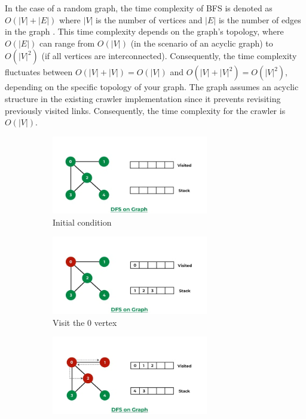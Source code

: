 In the case of a random graph, the time complexity of BFS is denoted as $O(|V|+|E|)$ where $|V|$ is the number of vertices and $|E|$ is the number of edges in the graph \cite{introduction-to-algorithms}. This time complexity depends on the graph's topology, where $O(|E|)$ can range from $O(|V|)$ (in the scenario of an acyclic graph) to $O(|V|^2)$ (if all vertices are interconnected). Consequently, the time complexity fluctuates between $O(|V| + |V|) = O(|V|)$ and $O(|V| + |V|^2) = O(|V|^2)$, depending on the specific topology of your graph. The graph assumes an acyclic structure in the existing crawler implementation since it prevents revisiting previously visited links. Consequently, the time complexity for the crawler is $O(|V|)$.
\begin{figure}[ht] 
  \begin{subfigure}[b]{0.5\textwidth}
    \centering
    \includegraphics[width=0.75\textwidth]{images/dfs-1.png} 
    \caption{Initial condition} 
    \label{fig7:a} 
    \vspace{4ex}
  \end{subfigure}%
  \begin{subfigure}[b]{0.5\textwidth}
    \centering
    \includegraphics[width=0.75\textwidth]{images/dfs-2.png} 
    \caption{Visit the 0 vertex}  
    \label{fig7:b} 
    \vspace{4ex}
  \end{subfigure} 
  \begin{subfigure}[b]{0.5\textwidth}
    \centering
    \includegraphics[width=0.75\textwidth]{images/dfs-3.png} 

\end{subfigure}
\end{figure}
